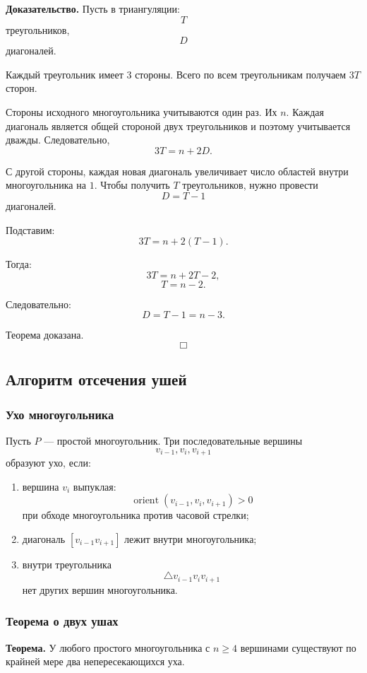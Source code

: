 \documentclass[12pt,a4paper]{article}
\begin{document}
\textbf{Доказательство.}
Пусть в триангуляции:
\[
T
\]
треугольников,
\[
D
\]
диагоналей.

Каждый треугольник имеет \(3\) стороны. Всего по всем треугольникам получаем \(3T\) сторон.

Стороны исходного многоугольника учитываются один раз. Их \(n\). Каждая диагональ является общей стороной двух треугольников и поэтому учитывается дважды. Следовательно,
\[
3T = n+2D.
\]

С другой стороны, каждая новая диагональ увеличивает число областей внутри многоугольника на \(1\). Чтобы получить \(T\) треугольников, нужно провести
\[
D=T-1
\]
диагоналей.

Подставим:
\[
3T=n+2(T-1).
\]

Тогда:
\[
3T=n+2T-2,
\]
\[
T=n-2.
\]

Следовательно:
\[
D=T-1=n-3.
\]

Теорема доказана.
\[
\Box
\]

\subsection{Алгоритм отсечения ушей}

\subsubsection{Ухо многоугольника}

Пусть \(P\) — простой многоугольник. Три последовательные вершины
\[
v_{i-1},v_i,v_{i+1}
\]
образуют ухо, если:

\begin{enumerate}
    \item вершина \(v_i\) выпуклая:
    \[
    \operatorname{orient}(v_{i-1},v_i,v_{i+1})>0
    \]
    при обходе многоугольника против часовой стрелки;
    \item диагональ \([v_{i-1}v_{i+1}]\) лежит внутри многоугольника;
    \item внутри треугольника
    \[
    \triangle v_{i-1}v_iv_{i+1}
    \]
    нет других вершин многоугольника.
\end{enumerate}

\subsubsection{Теорема о двух ушах}

\textbf{Теорема.}
У любого простого многоугольника с \(n\ge 4\) вершинами существуют по крайней мере два непересекающихся уха.
\end{document}
